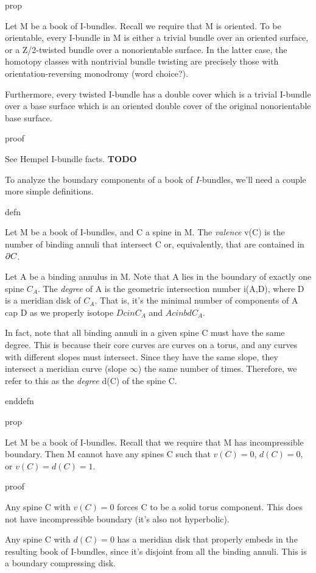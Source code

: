 prop

Let M be a book of I-bundles. Recall we require that M is oriented. To be
orientable, every I-bundle in M is either a trivial bundle over an oriented
surface, or a Z/2-twisted bundle over a nonorientable surface. In the latter
case, the homotopy classes with nontrivial bundle twisting are precisely those
with orientation-reversing monodromy (word choice?).

Furthermore, every twisted I-bundle has a double cover which is a trivial
I-bundle over a base surface which is an oriented double cover of the original
nonorientable base surface.

proof

See Hempel I-bundle facts. {\bf TODO}

To analyze the boundary components of a book of $I$-bundles, we'll need
a couple more simple definitions.

defn

Let M be a book of I-bundles, and C a spine in M.  The \emph{valence} v(C) is
the number of binding annuli that intersect C or, equivalently, that are
contained in $\partial C$.

Let A be a binding annulus in M. Note that A lies in the boundary of exactly
one spine $C_A$. The \emph{degree} of A is the geometric intersection number
i(A,D), where D is a meridian disk of $C_A$. That is, it's the minimal number
of components of A cap D as we properly isotope $D cin C_A$ and $A cin bd C_A$.

In fact, note that all binding annuli in a given spine C must have the same
degree. This is because their core curves are curves on a torus, and any curves
with different slopes must intersect. Since they have the same slope, they
intersect a meridian curve (slope $\infty$) the same number of times.
Therefore, we refer to this as the \emph{degree} d(C) of the spine C.

enddefn

prop

Let M be a book of I-bundles. Recall that we require that M has incompressible
boundary. Then M cannot have any spines C such that $v(C)=0$, $d(C)=0$, or
$v(C)=d(C)=1$.

proof

Any spine C with $v(C)=0$ forces C to be a solid torus component. This does not
have incompressible boundary (it's also not hyperbolic).

Any spine C with $d(C)=0$ has a meridian disk that properly embeds in the
resulting book of I-bundles, since it's disjoint from all the binding annuli.
This is a boundary compressing disk.

